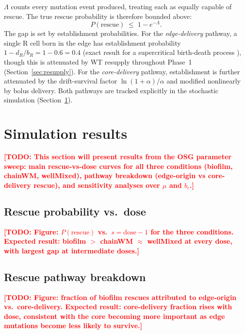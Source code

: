 \documentclass[12pt]{article}
\newcommand{\bCore}{b_c}
\newcommand{\TODO}[1]{\textcolor{red}{\textbf{[TODO: #1]}}}
\begin{document}
$\Lambda$ counts every mutation event produced, treating each as equally
capable of rescue. The true rescue probability is therefore bounded above:
\begin{equation}
    P(\text{rescue}) \;\leq\; 1 - e^{-\Lambda}.
    \label{eq:upper_bound}
\end{equation}
The gap is set by establishment probabilities. For the \emph{edge-delivery}
pathway, a single R cell born in the edge has establishment probability
$1 - d_R/b_R = 1 - 0.6 = 0.4$ (exact result for a supercritical
birth-death process \cite{athreya1972}), though this is attenuated by WT
resupply throughout Phase~1 (Section~\ref{sec:resupply}). For the
\emph{core-delivery} pathway, establishment is further attenuated by the
drift-survival factor $\ln(1+\alpha)/\alpha$ and modified nonlinearly by
bolus delivery. Both pathways are tracked explicitly in the stochastic
simulation (Section~\ref{sec:sims}).

\section{Simulation results}
\label{sec:sims}

\TODO{This section will present results from the OSG parameter sweep:
main rescue-vs-dose curves for all three conditions (biofilm, chainWM,
wellMixed), pathway breakdown (edge-origin vs core-delivery rescue), and
sensitivity analyses over $\mu$ and $\bCore$.}

\subsection{Rescue probability vs.\ dose}
\label{sec:rescue_vs_dose}

\TODO{Figure: $P(\text{rescue})$ vs.\ $s = \text{dose} - 1$ for the three
conditions. Expected result: biofilm $>$ chainWM $\approx$ wellMixed at
every dose, with largest gap at intermediate doses.}

\subsection{Rescue pathway breakdown}
\label{sec:pathways}

\TODO{Figure: fraction of biofilm rescues attributed to edge-origin vs.\
core-delivery. Expected result: core-delivery fraction rises with dose,
consistent with the core becoming more important as edge mutations become
less likely to survive.}
\end{document}
